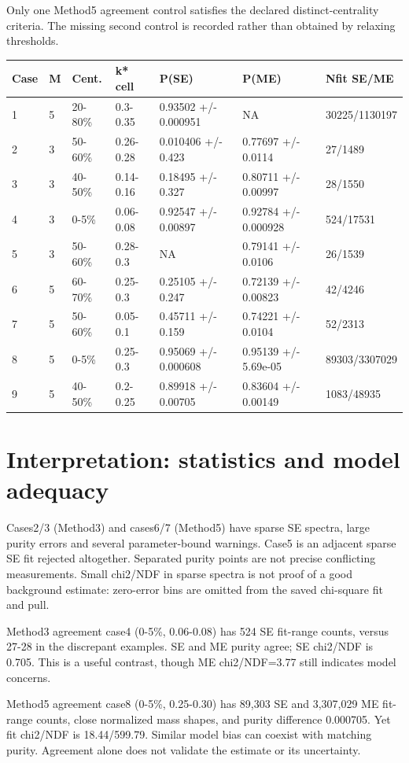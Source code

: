 \documentclass[10pt,a4paper]{article}
\begin{document}
Only one Method5 agreement control satisfies the declared distinct-centrality criteria. The missing second control is recorded rather than obtained by relaxing thresholds.

{\small\setlength{\tabcolsep}{3pt}\begin{longtable}{lllllll}\toprule
Case & M & Cent. & k* cell & P(SE) & P(ME) & Nfit SE/ME\\\midrule\endhead
1 & 5 & 20-80\% & 0.3-0.35 & 0.93502 +/- 0.000951 & NA & 30225/1130197\\
2 & 3 & 50-60\% & 0.26-0.28 & 0.010406 +/- 0.423 & 0.77697 +/- 0.0114 & 27/1489\\
3 & 3 & 40-50\% & 0.14-0.16 & 0.18495 +/- 0.327 & 0.80711 +/- 0.00997 & 28/1550\\
4 & 3 & 0-5\% & 0.06-0.08 & 0.92547 +/- 0.00897 & 0.92784 +/- 0.000928 & 524/17531\\
5 & 3 & 50-60\% & 0.28-0.3 & NA & 0.79141 +/- 0.0106 & 26/1539\\
6 & 5 & 60-70\% & 0.25-0.3 & 0.25105 +/- 0.247 & 0.72139 +/- 0.00823 & 42/4246\\
7 & 5 & 50-60\% & 0.05-0.1 & 0.45711 +/- 0.159 & 0.74221 +/- 0.0104 & 52/2313\\
8 & 5 & 0-5\% & 0.25-0.3 & 0.95069 +/- 0.000608 & 0.95139 +/- 5.69e-05 & 89303/3307029\\
9 & 5 & 40-50\% & 0.2-0.25 & 0.89918 +/- 0.00705 & 0.83604 +/- 0.00149 & 1083/48935\\
\bottomrule\end{longtable}}
\clearpage
\section*{Interpretation: statistics and model adequacy}
Cases2/3 (Method3) and cases6/7 (Method5) have sparse SE spectra, large purity errors and several parameter-bound warnings. Case5 is an adjacent sparse SE fit rejected altogether. Separated purity points are not precise conflicting measurements. Small chi2/NDF in sparse spectra is not proof of a good background estimate: zero-error bins are omitted from the saved chi-square fit and pull.

Method3 agreement case4 (0-5\%, 0.06-0.08) has 524 SE fit-range counts, versus 27-28 in the discrepant examples. SE and ME purity agree; SE chi2/NDF is 0.705. This is a useful contrast, though ME chi2/NDF=3.77 still indicates model concerns.

Method5 agreement case8 (0-5\%, 0.25-0.30) has 89,303 SE and 3,307,029 ME fit-range counts, close normalized mass shapes, and purity difference 0.000705. Yet fit chi2/NDF is 18.44/599.79. Similar model bias can coexist with matching purity. Agreement alone does not validate the estimate or its uncertainty.
\end{document}
